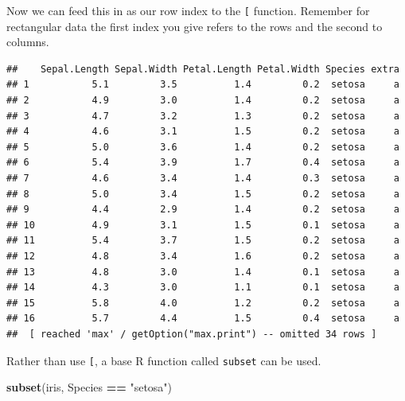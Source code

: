 \documentclass[
]{book}
\newenvironment{Shaded}{\begin{snugshade}}{\end{snugshade}}
\newcommand{\KeywordTok}[1]{\textcolor[rgb]{0.13,0.29,0.53}{\textbf{#1}}}
\newcommand{\NormalTok}[1]{#1}
\newcommand{\OperatorTok}[1]{\textcolor[rgb]{0.81,0.36,0.00}{\textbf{#1}}}
\newcommand{\StringTok}[1]{\textcolor[rgb]{0.31,0.60,0.02}{#1}}
\theoremstyle{definition}
\theoremstyle{definition}
\theoremstyle{definition}
\theoremstyle{remark}
\begin{document}
Now we can feed this in as our row index to the \texttt{{[}} function. Remember for rectangular data the first index you give refers to the rows and the second to columns.

\begin{Shaded}
\end{Shaded}

\begin{verbatim}
##    Sepal.Length Sepal.Width Petal.Length Petal.Width Species extra
## 1           5.1         3.5          1.4         0.2  setosa     a
## 2           4.9         3.0          1.4         0.2  setosa     a
## 3           4.7         3.2          1.3         0.2  setosa     a
## 4           4.6         3.1          1.5         0.2  setosa     a
## 5           5.0         3.6          1.4         0.2  setosa     a
## 6           5.4         3.9          1.7         0.4  setosa     a
## 7           4.6         3.4          1.4         0.3  setosa     a
## 8           5.0         3.4          1.5         0.2  setosa     a
## 9           4.4         2.9          1.4         0.2  setosa     a
## 10          4.9         3.1          1.5         0.1  setosa     a
## 11          5.4         3.7          1.5         0.2  setosa     a
## 12          4.8         3.4          1.6         0.2  setosa     a
## 13          4.8         3.0          1.4         0.1  setosa     a
## 14          4.3         3.0          1.1         0.1  setosa     a
## 15          5.8         4.0          1.2         0.2  setosa     a
## 16          5.7         4.4          1.5         0.4  setosa     a
##  [ reached 'max' / getOption("max.print") -- omitted 34 rows ]
\end{verbatim}

Rather than use \texttt{{[}}, a base R function called \texttt{subset} can be used.

\begin{Shaded}
\begin{Highlighting}[]
\KeywordTok{subset}\NormalTok{(iris, Species }\OperatorTok{==}\StringTok{ "setosa"}\NormalTok{)}
\end{Highlighting}
\end{Shaded}
\end{document}
